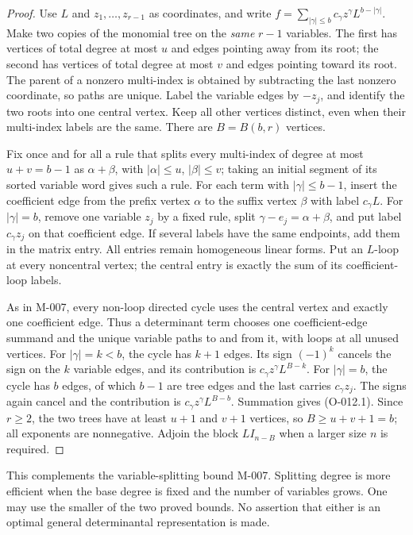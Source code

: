 \begin{proof}
Use $L$ and $z_1,\ldots,z_{r-1}$ as coordinates, and write
$f=\sum_{|\gamma|\leq b}c_\gamma z^\gamma L^{b-|\gamma|}$.
Make two copies of the monomial tree on the \emph{same} $r-1$
variables. The first has vertices of total degree at most $u$
and edges pointing away from its root; the second has vertices
of total degree at most $v$ and edges pointing toward its root.
The parent of a nonzero multi-index is obtained by subtracting
the last nonzero coordinate, so paths are unique. Label the
variable edges by $-z_j$, and identify the two roots into one
central vertex. Keep all other vertices distinct, even when
their multi-index labels are the same. There are $B=B(b,r)$ vertices.

Fix once and for all a rule that splits every multi-index of
degree at most $u+v=b-1$ as $\alpha+\beta$, with
$|\alpha|\leq u$, $|\beta|\leq v$; taking an initial segment
of its sorted variable word gives such a rule. For each term
with $|\gamma|\leq b-1$, insert the coefficient edge from
the prefix vertex $\alpha$ to the suffix vertex $\beta$ with
label $c_\gamma L$. For $|\gamma|=b$, remove one variable
$z_j$ by a fixed rule, split $\gamma-e_j=\alpha+\beta$,
and put label $c_\gamma z_j$ on that coefficient edge.
If several labels have the same endpoints, add them in the
matrix entry. All entries remain homogeneous linear forms.
Put an $L$-loop at every noncentral vertex; the central entry
is exactly the sum of its coefficient-loop labels.

As in M-007, every non-loop directed cycle uses the central
vertex and exactly one coefficient edge. Thus a determinant
term chooses one coefficient-edge summand and the unique
variable paths to and from it, with loops at all unused vertices.
For $|\gamma|=k<b$, the cycle has $k+1$ edges. Its sign
$(-1)^k$ cancels the sign on the $k$ variable edges, and its
contribution is $c_\gamma z^\gamma L^{B-k}$.
For $|\gamma|=b$, the cycle has $b$ edges, of which $b-1$
are tree edges and the last carries $c_\gamma z_j$.
The signs again cancel and the contribution is
$c_\gamma z^\gamma L^{B-b}$.
Summation gives (O-012.1). Since $r\geq2$, the two trees have
at least $u+1$ and $v+1$ vertices, so $B\geq u+v+1=b$;
all exponents are nonnegative. Adjoin the block $L I_{n-B}$
when a larger size $n$ is required.
\end{proof}

This complements the variable-splitting bound M-007. Splitting
degree is more efficient when the base degree is fixed and the
number of variables grows. One may use the smaller of the two
proved bounds. No assertion that either is an optimal general
determinantal representation is made.

